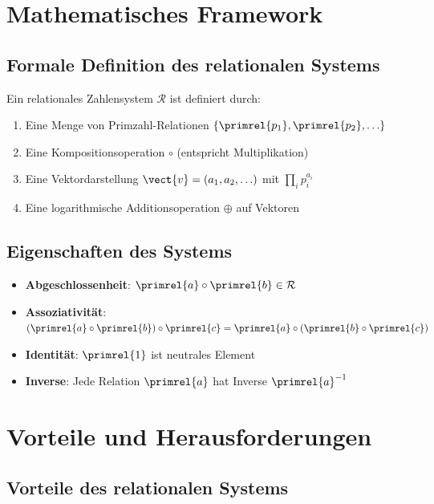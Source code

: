 	\section{Mathematisches Framework}
	
	\subsection{Formale Definition des relationalen Systems}
	
	\begin{theorem}
		Ein relationales Zahlensystem $\mathcal{R}$ ist definiert durch:
		\begin{enumerate}
			\item Eine Menge von Primzahl-Relationen $\{\primrel{p_1}, \primrel{p_2}, \ldots\}$
			\item Eine Kompositionsoperation $\circ$ (entspricht Multiplikation)
			\item Eine Vektordarstellung $\vect{v} = (a_1, a_2, \ldots)$ mit $\prod_i p_i^{a_i}$
			\item Eine logarithmische Additionsoperation $\oplus$ auf Vektoren
		\end{enumerate}
	\end{theorem}
	
	\subsection{Eigenschaften des Systems}
	
	\begin{itemize}
		\item \textbf{Abgeschlossenheit}: $\primrel{a} \circ \primrel{b} \in \mathcal{R}$
		\item \textbf{Assoziativität}: $(\primrel{a} \circ \primrel{b}) \circ \primrel{c} = \primrel{a} \circ (\primrel{b} \circ \primrel{c})$
		\item \textbf{Identität}: $\primrel{1}$ ist neutrales Element
		\item \textbf{Inverse}: Jede Relation $\primrel{a}$ hat Inverse $\primrel{a}^{-1}$
	\end{itemize}
	
	\section{Vorteile und Herausforderungen}
	
	\subsection{Vorteile des relationalen Systems}
	
